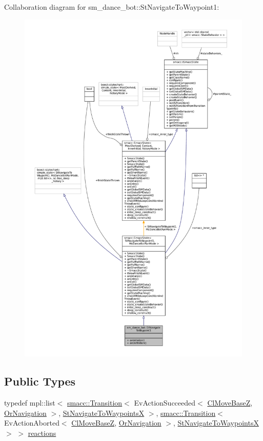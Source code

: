 Collaboration diagram for sm\+\_\+dance\+\_\+bot\+:\+:St\+Navigate\+To\+Waypoint1\+:
\nopagebreak
\begin{figure}[H]
\begin{center}
\leavevmode
\includegraphics[width=350pt]{structsm__dance__bot_1_1StNavigateToWaypoint1__coll__graph}
\end{center}
\end{figure}
\subsection*{Public Types}
\begin{DoxyCompactItemize}
\item 
typedef mpl\+::list$<$ \hyperlink{classsmacc_1_1Transition}{smacc\+::\+Transition}$<$ Ev\+Action\+Succeeded$<$ \hyperlink{classmove__base__z__client_1_1ClMoveBaseZ}{Cl\+Move\+BaseZ}, \hyperlink{classsm__dance__bot_1_1OrNavigation}{Or\+Navigation} $>$, \hyperlink{structsm__dance__bot_1_1StNavigateToWaypointsX}{St\+Navigate\+To\+WaypointsX} $>$, \hyperlink{classsmacc_1_1Transition}{smacc\+::\+Transition}$<$ Ev\+Action\+Aborted$<$ \hyperlink{classmove__base__z__client_1_1ClMoveBaseZ}{Cl\+Move\+BaseZ}, \hyperlink{classsm__dance__bot_1_1OrNavigation}{Or\+Navigation} $>$, \hyperlink{structsm__dance__bot_1_1StNavigateToWaypointsX}{St\+Navigate\+To\+WaypointsX} $>$ $>$ \hyperlink{structsm__dance__bot_1_1StNavigateToWaypoint1_a21fa0c94f580ad96682e36bf72bbf32c}{reactions}
\end{DoxyCompactItemize}
